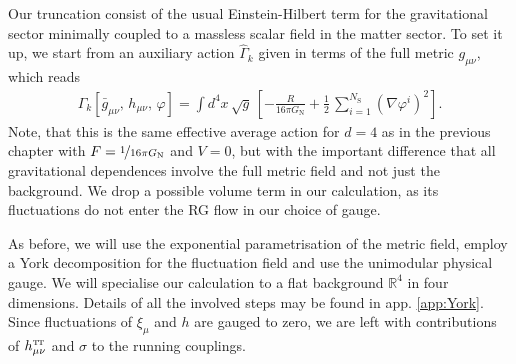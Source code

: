 \documentclass[11pt]{book} %
\newcommand\TTspace{ -1pt }
\newcommand\gmunu{ g_{\mu\nu} }
\newcommand\bgmunu{ \bar g_{\mu\nu} }
\newcommand\hmunu{ h_{\mu\nu} }
\newcommand\hTTmunu{ h^{\scriptscriptstyle{\mathrm{T\hspace{\TTspace}T}}}_{\mu\nu} }
\newcommand\NS{ N_{\scriptscriptstyle{\mathrm{S}}} }
\newcommand\GNewton{ G_{\scriptscriptstyle{\mathrm{N}}} }
\numberwithin{equation}{chapter}
\begin{document}
Our truncation consist of the usual Einstein-Hilbert term for the gravitational sector minimally coupled
to a massless scalar field in the matter sector.
To set it up, we start from an auxiliary action $\hat{\Gamma}_k$ given in terms of the full
metric $\gmunu$, which reads
\begin{align}
  \hat \Gamma_k[\bgmunu, \, \hmunu, \, \varphi] = \int d^4x \, \sqrt{g} \,
  \left[
    - \frac{R}{16 \pi \GNewton} + \frac{1}{2} \, \sum_{i=1}^{\NS} \left( \nabla\varphi^i \right)^2
  \right] .
\end{align}
Note, that this is the same effective average action for $d=4$ as in the previous chapter with
$F=\nicefrac{1}{16\pi\GNewton}$ and $V=0$, but with the important difference that all gravitational
dependences involve the full metric field and not just the background.
We drop a possible volume term in our calculation,
as its fluctuations do not enter the RG flow in our choice of gauge.

As before, we will use the exponential parametrisation of the metric field,
employ a York decomposition for the fluctuation field and use the unimodular physical gauge.
We will specialise our calculation to a flat background $\mathbb R^4$ in four dimensions.
Details of all the involved steps may be found in app. \ref{app:York}.
Since fluctuations of $\xi_\mu$ and $h$ are gauged to zero,
we are left with contributions of $\hTTmunu$ and $\sigma$ to the running couplings.
\end{document}
